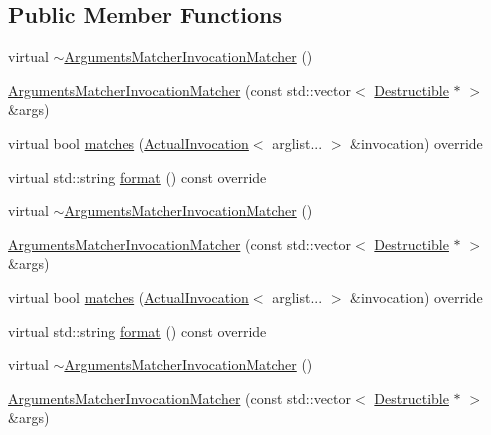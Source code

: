 \subsection*{Public Member Functions}
\begin{DoxyCompactItemize}
\item 
virtual \mbox{\hyperlink{structfakeit_1_1ArgumentsMatcherInvocationMatcher_a7674a20f37f1b19f7597eb24d9deb392}{$\sim$\+Arguments\+Matcher\+Invocation\+Matcher}} ()
\item 
\mbox{\hyperlink{structfakeit_1_1ArgumentsMatcherInvocationMatcher_aad6c81f17ede575178414c2c7581e800}{Arguments\+Matcher\+Invocation\+Matcher}} (const std\+::vector$<$ \mbox{\hyperlink{classfakeit_1_1Destructible}{Destructible}} $\ast$ $>$ \&args)
\item 
virtual bool \mbox{\hyperlink{structfakeit_1_1ArgumentsMatcherInvocationMatcher_a7da0c96fb549a6bb4b944214514e4ca8}{matches}} (\mbox{\hyperlink{structfakeit_1_1ActualInvocation}{Actual\+Invocation}}$<$ arglist... $>$ \&invocation) override
\item 
virtual std\+::string \mbox{\hyperlink{structfakeit_1_1ArgumentsMatcherInvocationMatcher_a5174a0a696bbbc3090b4b1d7937c02f9}{format}} () const override
\item 
virtual \mbox{\hyperlink{structfakeit_1_1ArgumentsMatcherInvocationMatcher_a7674a20f37f1b19f7597eb24d9deb392}{$\sim$\+Arguments\+Matcher\+Invocation\+Matcher}} ()
\item 
\mbox{\hyperlink{structfakeit_1_1ArgumentsMatcherInvocationMatcher_aad6c81f17ede575178414c2c7581e800}{Arguments\+Matcher\+Invocation\+Matcher}} (const std\+::vector$<$ \mbox{\hyperlink{classfakeit_1_1Destructible}{Destructible}} $\ast$ $>$ \&args)
\item 
virtual bool \mbox{\hyperlink{structfakeit_1_1ArgumentsMatcherInvocationMatcher_a7da0c96fb549a6bb4b944214514e4ca8}{matches}} (\mbox{\hyperlink{structfakeit_1_1ActualInvocation}{Actual\+Invocation}}$<$ arglist... $>$ \&invocation) override
\item 
virtual std\+::string \mbox{\hyperlink{structfakeit_1_1ArgumentsMatcherInvocationMatcher_a5174a0a696bbbc3090b4b1d7937c02f9}{format}} () const override
\item 
virtual \mbox{\hyperlink{structfakeit_1_1ArgumentsMatcherInvocationMatcher_a7674a20f37f1b19f7597eb24d9deb392}{$\sim$\+Arguments\+Matcher\+Invocation\+Matcher}} ()
\item 
\mbox{\hyperlink{structfakeit_1_1ArgumentsMatcherInvocationMatcher_aad6c81f17ede575178414c2c7581e800}{Arguments\+Matcher\+Invocation\+Matcher}} (const std\+::vector$<$ \mbox{\hyperlink{classfakeit_1_1Destructible}{Destructible}} $\ast$ $>$ \&args)

\end{DoxyCompactItemize}
